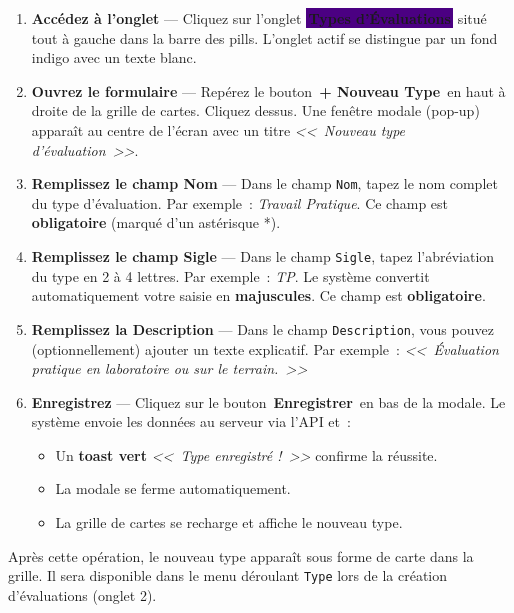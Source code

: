 \documentclass[12pt,a4paper]{report}
\newcommand{\champ}[1]{\texttt{\color{violet}#1}}
\newcommand{\bouton}[1]{{\colorbox{emerald}{\small\sffamily\bfseries\color{white}\,#1\,}}}
\newcommand{\onglet}[1]{{\colorbox{indigo}{\small\sffamily\bfseries\color{white}\,#1\,}}}
\begin{document}
\begin{etape}[title=Procédure détaillée : Créer un type d'évaluation]
\begin{enumerate}[leftmargin=1.5cm,label=\textbf{\arabic*.},itemsep=12pt]
  \item \textbf{Accédez à l'onglet} — Cliquez sur l'onglet \onglet{Types d'Évaluations} situé tout à gauche dans la barre des pills. L'onglet actif se distingue par un fond indigo avec un texte blanc.

  \item \textbf{Ouvrez le formulaire} — Repérez le bouton \bouton{+ Nouveau Type} en haut à droite de la grille de cartes. Cliquez dessus. Une fenêtre modale (pop-up) apparaît au centre de l'écran avec un titre \textit{<<~Nouveau type d'évaluation~>>}.

  \item \textbf{Remplissez le champ Nom} — Dans le champ \champ{Nom}, tapez le nom complet du type d'évaluation. Par exemple~: \textit{Travail Pratique}. Ce champ est \textbf{obligatoire} (marqué d'un astérisque *).

  \item \textbf{Remplissez le champ Sigle} — Dans le champ \champ{Sigle}, tapez l'abréviation du type en 2 à 4 lettres. Par exemple~: \textit{TP}. Le système convertit automatiquement votre saisie en \textbf{majuscules}. Ce champ est \textbf{obligatoire}.

  \item \textbf{Remplissez la Description} — Dans le champ \champ{Description}, vous pouvez (optionnellement) ajouter un texte explicatif. Par exemple~: \textit{<<~Évaluation pratique en laboratoire ou sur le terrain.~>>}

  \item \textbf{Enregistrez} — Cliquez sur le bouton \bouton{Enregistrer} en bas de la modale. Le système envoie les données au serveur via l'API et~:
  \begin{itemize}
    \item Un \textbf{toast vert} \textit{<<~Type enregistré !~>>} confirme la réussite.
    \item La modale se ferme automatiquement.
    \item La grille de cartes se recharge et affiche le nouveau type.
  \end{itemize}
\end{enumerate}
\end{etape}

\begin{resultat}
Après cette opération, le nouveau type apparaît sous forme de carte dans la grille. Il sera disponible dans le menu déroulant \champ{Type} lors de la création d'évaluations (onglet 2).
\end{resultat}
\end{document}
